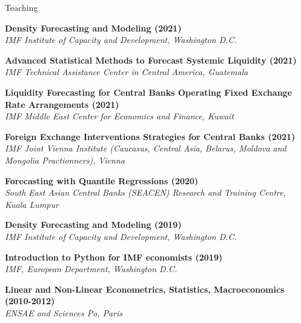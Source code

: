 \documentclass[usegeometry, 10pt, a4paper]{cv} %
\newcommand{\activite}[1]{\textbf{#1}\ }
\begin{document}
\begin{rubriquetableau}[0.95\textwidth]{Teaching}\\
\vspace{-0.5cm}
  
\small
\activite{Density Forecasting and Modeling (2021)} \\
\hspace{0.6cm} \small{\emph{IMF Institute of Capacity and Development, Washington D.C.}}
\vspace{0.4cm}

\small
\activite{Advanced Statistical Methods to Forecast Systemic Liquidity (2021)} \\
\hspace{0.6cm} \small{\emph{IMF Technical Assistance Center in Central America, Guatemala}}
\vspace{0.4cm}
  
\small
\activite{Liquidity Forecasting for Central Banks Operating Fixed Exchange Rate Arrangements (2021)} \\
\hspace{0.6cm} \small{\emph{IMF Middle East Center for Economics and Finance, Kuwait}}
\vspace{0.4cm}

\small
\activite{Foreign Exchange Interventions Strategies for Central Banks (2021)} \\
\hspace{0.6cm} \small{\emph{IMF Joint Vienna Institute (Caucasus, Central
    Asia, Belarus, Moldova and Mongolia Practionners), Vienna}}
\vspace{0.4cm}

\small
\activite{Forecasting with Quantile Regressions (2020)} \\
\hspace{0.6cm} \small{\emph{South East Asian Central Banks (SEACEN) Research and Training Centre, Kuala Lumpur}}
\vspace{0.4cm}
  
\small
\activite{Density Forecasting and Modeling (2019)} \\
\hspace{0.6cm} \small{\emph{IMF Institute of Capacity and Development, Washington D.C.}}
\vspace{0.4cm}

\small
\activite{Introduction to Python for IMF economists (2019)} \\
\hspace{0.6cm} \small{\emph{IMF, European Department, Washington D.C.}}
\vspace{0.4cm} 

\small
\activite{Linear and Non-Linear Econometrics, Statistics, Macroeconomics (2010-2012)} \\
\hspace{0.6cm} \small{\emph{ENSAE and Sciences Po, Paris}}
\vspace{0.4cm} 
\end{rubriquetableau}
\end{document}
